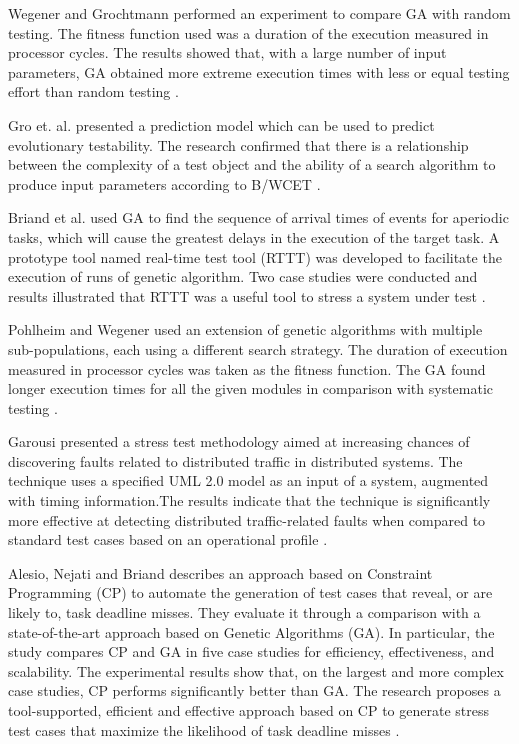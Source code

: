 \documentclass{bmcart}
\begin{document}
Wegener and Grochtmann performed an  experiment
to compare GA with random testing. The fitness function used was a duration of the execution measured in processor cycles.  The results showed that, with a large number of input parameters, GA obtained more extreme execution times with less or equal testing effort than random testing \citep{J.WegenerK.GrimmM.GrochtmannH.Sthamer1996} \citep{Wegener1998}.


Gro et. al. \citep{Gross2000} presented a prediction model  which can be used to predict evolutionary testability. The research confirmed that there is a relationship between the complexity of a test object and the ability of a search algorithm to produce input parameters according to B/WCET \citep{Gross2000}. 

Briand et al. \citep{Briand2005} used GA to find the sequence of arrival times of events for aperiodic tasks, which will cause the greatest delays in the execution of the target task. A prototype tool named real-time test tool (RTTT) was developed to facilitate the execution of runs of genetic algorithm. Two case studies were conducted and results illustrated that RTTT was a useful tool to stress a system under test \citep{Briand2005}.


Pohlheim and Wegener used an extension of genetic algorithms with multiple sub-populations, each using a different search strategy. The duration of execution measured in processor cycles was taken as the fitness
function. The GA found longer execution times for all the given modules in comparison with systematic testing \citep{Pohlheim2005}.

Garousi presented a stress test methodology aimed at increasing chances of discovering faults related to distributed traffic in distributed systems. The technique uses a specified UML 2.0 model as an input of a system, augmented with timing information.The results indicate that the technique is significantly more effective at detecting distributed traffic-related faults when compared to standard test cases based on an operational profile \citep{Garousi2006}.

Alesio, Nejati and Briand describes an approach based
on Constraint Programming (CP) to automate the generation of test cases that reveal, or are likely to, task deadline misses. They evaluate it through a comparison with a state-of-the-art approach based on Genetic Algorithms (GA). In particular, the study compares CP and GA in five case studies for efficiency, effectiveness, and scalability. The experimental results show that, on the largest and more complex case studies, CP performs significantly better than GA. The research proposes a tool-supported, efficient and effective approach based on CP to generate stress test cases that maximize the likelihood of task deadline misses \citep{DiAlesio2013}.
\end{document}
